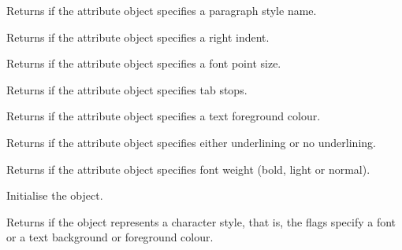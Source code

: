 Returns \true if the attribute object specifies a paragraph style name.

\label{wxrichtextattrhasrightindent}


Returns \true if the attribute object specifies a right indent.

\label{wxrichtextattrhassize}


Returns \true if the attribute object specifies a font point size.

\label{wxrichtextattrhastabs}


Returns \true if the attribute object specifies tab stops.

\label{wxrichtextattrhastextcolour}


Returns \true if the attribute object specifies a text foreground colour.

\label{wxrichtextattrhasunderlined}


Returns \true if the attribute object specifies either underlining or no underlining.

\label{wxrichtextattrhasweight}


Returns \true if the attribute object specifies font weight (bold, light or normal).

\label{wxrichtextattrinit}


Initialise the object.

\label{wxrichtextattrischaracterstyle}


Returns \true if the object represents a character style, that is,
the flags specify a font or a text background or foreground colour.

\label{wxrichtextattrisdefault}

